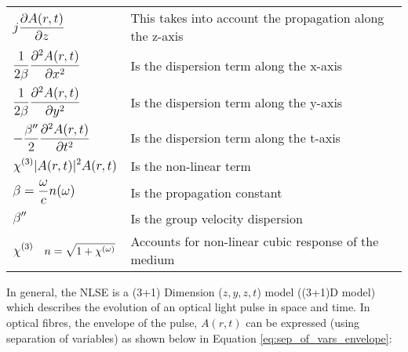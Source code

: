 \documentclass[colorlinks,11pt,a4paper,normalphoto,withhyper,ragged2e]{altareport}
\begin{document}
	\begin{center}
	\begin{table}[htbp!]
	    \centering
	    \begin{tabular}{p{5cm} p{8cm}}
	        $\mathlarger{ \mathlarger{ j \frac{\partial A(r,t)}{\partial z} } }$ \vspace{5mm} & This takes into account the propagation along the z-axis \\
	        $\mathlarger{ \mathlarger{ \frac{1}{2 \beta} \frac{\partial^2 A(r,t)}{\partial x^2} } }$ \vspace{5mm} & Is the dispersion term along the x-axis \\
	        $\mathlarger{ \mathlarger{ \frac{1}{2 \beta} \frac{\partial^2 A(r,t)}{\partial y^2} } }$ \vspace{5mm} & Is the dispersion term along the y-axis \\
	        $\mathlarger{ \mathlarger{ - \frac{ \beta ''}{2} \frac{\partial^2 A(r,t)}{\partial t^2} } }$ \vspace{5mm} & Is the dispersion term along the t-axis \\
	        $\mathlarger{ \mathlarger{ \chi^{(3)} |A(r,t)|^2 A(r,t) } }$ \vspace{5mm} & Is the non-linear term \\
	        $\mathlarger{ \mathlarger{ \beta = \frac{\omega}{c} n(\omega) } }$ \vspace{5mm} & Is the propagation constant \\
	        $\mathlarger{ \mathlarger{ \beta '' } }$ \vspace{5mm} & Is the group velocity dispersion \\
	        $\mathlarger{ \mathlarger{ \chi^{(3)} } \quad n = \sqrt{1+\chi^{(\omega)}}}$ \vspace{5mm} & Accounts for non-linear cubic response of the medium \\
	    \end{tabular}
	    \label{table_lin_eq}
	\end{table}
	\end{center}
	
	In general, the NLSE is a (3+1) Dimension ($z, y, z, t$) model ((3+1)D model) which describes the evolution of an optical light pulse in space and time.
	In optical fibres, the envelope of the pulse, $A(r,t)$ can be expressed (using separation of variables) as shown below in Equation \ref{eq:sep_of_vars_envelope}: \linebreak
	
\end{document}
